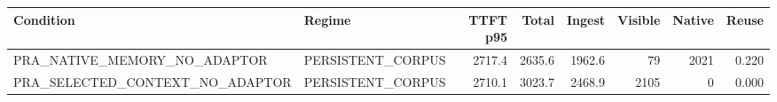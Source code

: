 \begin{tabular}{llrrrrrr}
\toprule
Condition & Regime & TTFT p95 & Total & Ingest & Visible & Native & Reuse \\
\midrule
PRA\_NATIVE\_MEMORY\_NO\_ADAPTOR & PERSISTENT_CORPUS & 2717.4 & 2635.6 & 1962.6 & 79 & 2021 & 0.220 \\
PRA\_SELECTED\_CONTEXT\_NO\_ADAPTOR & PERSISTENT_CORPUS & 2710.1 & 3023.7 & 2468.9 & 2105 & 0 & 0.000 \\
\bottomrule
\end{tabular}
